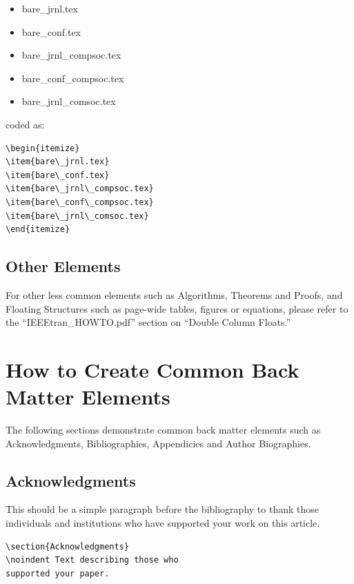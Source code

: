 \documentclass[lettersize,journal]{IEEEtran}
\begin{document}

\begin{itemize}
\item{bare\_jrnl.tex}
\item{bare\_conf.tex}
\item{bare\_jrnl\_compsoc.tex}
\item{bare\_conf\_compsoc.tex}
\item{bare\_jrnl\_comsoc.tex}
\end{itemize}

\noindent coded as:

\begin{verbatim}
\begin{itemize}
\item{bare\_jrnl.tex}
\item{bare\_conf.tex}
\item{bare\_jrnl\_compsoc.tex}
\item{bare\_conf\_compsoc.tex}
\item{bare\_jrnl\_comsoc.tex}
\end{itemize}
\end{verbatim}


\subsection{Other Elements}
\noindent For other less common elements such as Algorithms, Theorems and Proofs, and Floating Structures such as page-wide tables, figures or equations, please refer to the ``IEEEtran\_HOWTO.pdf'' section on ``Double Column Floats.''


\section{How to Create Common Back Matter Elements}
\noindent The following sections demonstrate common back matter elements such as Acknowledgments, Bibliographies, Appendicies and Author Biographies.

\subsection{Acknowledgments}
\noindent This should be a simple paragraph before the bibliography to thank those individuals and institutions who have supported your work on this article.

\begin{verbatim}
\section{Acknowledgments}
\noindent Text describing those who 
supported your paper.
\end{verbatim}
\end{document}
